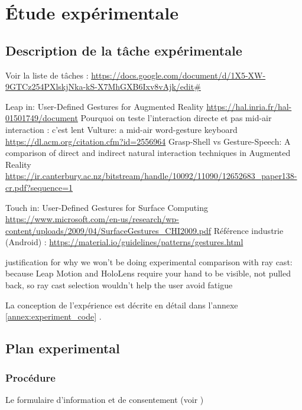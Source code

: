 \chapter{Étude expérimentale}
\label{ch:experiment}

\section{Description de la tâche expérimentale}
\label{sec:experiment_description}

Voir la liste de tâches : \url{https://docs.google.com/document/d/1X5-XW-9GTCz254PXlskjNka-kS-X7MhGXB6Ixv8vAjk/edit#}

Leap in:
User-Defined Gestures for Augmented Reality \url{https://hal.inria.fr/hal-01501749/document}
Pourquoi on teste l'interaction directe et pas mid-air interaction : c'est lent Vulture: a mid-air word-gesture keyboard \url{https://dl.acm.org/citation.cfm?id=2556964}
Grasp-Shell vs Gesture-Speech: A comparison of direct and indirect natural interaction
techniques in Augmented Reality \url{https://ir.canterbury.ac.nz/bitstream/handle/10092/11090/12652683_paper138-cr.pdf?sequence=1}

Touch in:
User-Defined Gestures for Surface Computing \url{https://www.microsoft.com/en-us/research/wp-content/uploads/2009/04/SurfaceGestures_CHI2009.pdf}
Référence industrie (Android) : \url{https://material.io/guidelines/patterns/gestures.html}

justification for why we won’t be doing experimental comparison with ray cast: because Leap Motion and HoloLens require your hand to be visible, not pulled back, so ray cast selection wouldn’t help the user avoid fatigue

La conception de l'expérience est décrite en détail dans l'annexe \ref{annex:experiment_code} .


\section{Plan experimental}
\subsection{Procédure}
Le formulaire d'information et de consentement (voir )

